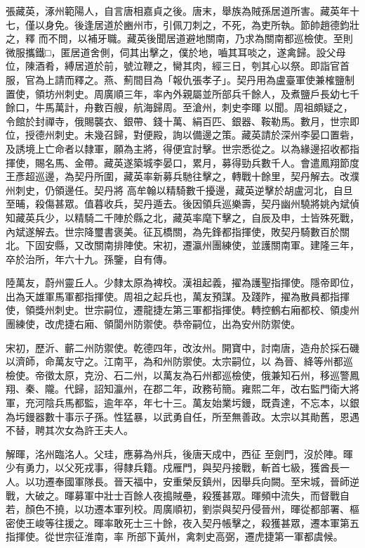 \begin{pinyinscope}
 張藏英，涿州範陽人，自言唐相嘉貞之後。唐末，舉族為賊孫居道所害。藏英年十七，僅以身免。後逢居道於豳州市，引佩刀刺之，不死，為吏所執。節帥趙德鈞壯之，釋
 而不問，以補牙職。藏英後聞居道避地關南，乃求為關南都巡檢使。至則微服攜鐵□，匿居道舍側，伺其出擊之，僕於地，嚙其耳啖之，遂禽歸。設父母位，陳酒肴，縛居道於前，號泣鞭之，臠其肉，經三日，刳其心以祭。即詣官首服，官為上請而釋之。燕、薊間目為「報仇張孝子」。契丹用為盧臺軍使兼榷鹽制置使，領坊州刺史。周廣順三年，率內外親屬並所部兵千餘人，及煮鹽戶長幼七千餘口，牛馬萬計，舟數百艘，航海歸周。至滄州，刺史李暉
 以聞。周祖頗疑之，令館於封禪寺，俄賜襲衣、銀帶、錢十萬、絹百匹、銀器、鞍勒馬。數月，世宗即位，授德州刺史。未幾召歸，對便殿，詢以備邊之策。藏英請於深州李晏口置砦，及誘境上亡命者以隸軍，願為主將，得便宜討擊。世宗悉從之。以為緣邊招收都指揮使，賜名馬、金帶。藏英遂築城李晏口，累月，募得勁兵數千人。會遣鳳翔節度王彥超巡邊，為契丹所圍，藏英率新募兵馳往擊之，轉戰十餘里，契丹解去。改濮州刺史，仍領邊任。契丹將
 高牟翰以精騎數千擾邊，藏英逆擊於胡盧河北，自旦至晡，殺傷甚眾。值暮收兵，契丹遁去。後因領兵巡樂壽，契丹幽州驍將姚內斌偵知藏英兵少，以精騎二千陣於縣之北，藏英率麾下擊之，自辰及申，士皆殊死戰，內斌遂解去。世宗降璽書褒美。征瓦橋關，為先鋒都指揮使，敗契丹騎數百於關北。下固安縣，又改關南排陣使。宋初，遷瀛州團練使，並護關南軍。建隆三年，卒於治所，年六十九。孫鑒，自有傳。



 陸萬友，蔚州靈丘人。少隸太原為裨校。漢祖起義，擢為護聖指揮使。隱帝即位，出為天雄軍馬軍都指揮使。周祖之起兵也，萬友預謀。及踐阼，擢為散員都指揮使，領獎州刺史。世宗嗣位，遷龍捷左第三軍都指揮使。轉控鶴右廂都校、領虔州團練使，改虎捷右廂、領閬州防禦使。恭帝嗣位，出為安州防禦使。



 宋初，歷沂、蘄二州防禦使。乾德四年，改汝州。開寶中，討南唐，造舟於採石磯以濟師，命萬友守之。江南平，為和州防禦使。太宗嗣位，以
 為晉、絳等州都巡檢使。帝徵太原，克汾、石二州，以萬友為石州都巡檢使，俄兼知石州，移巡警鳳翔、秦、隴。代歸，詔知瀛州，在郡二年，政務茍簡。雍熙二年，改右監門衛大將軍，充河陰兵馬都監，逾年卒，年七十三。萬友始業圬鏝，既貴達，不忘本，以銀為圬鏝器數十事示子孫。性猛暴，以武勇自任，所至無善政。太宗以其勛舊，恩遇不替，聘其次女為許王夫人。



 解暉，洺州臨洺人。父珪，應募為州兵，後唐天成中，西征
 至劍門，沒於陣。暉少有勇力，以父死戎事，得隸兵籍。戍雁門，與契丹接戰，斬首七級，獲酋長一人。以功遷奉國軍隊長。晉天福中，安重榮反鎮州，因舉兵向闕。至宋城，晉師逆戰，大破之。暉募軍中壯士百餘人夜搗賊壘，殺獲甚眾。暉頻中流失，而督戰自若，顏色不撓，以功遷本軍列校。周廣順初，劉崇與契丹侵晉州，暉從都部署、樞密使王峻等往援之。暉率敢死士三十餘，夜入契丹帳擊之，殺獲甚眾，遷本軍第五指揮使。從世宗征淮南，率
 所部下黃州，禽刺史高弼，遷虎捷第一軍都虞候。




\end{pinyinscope}
